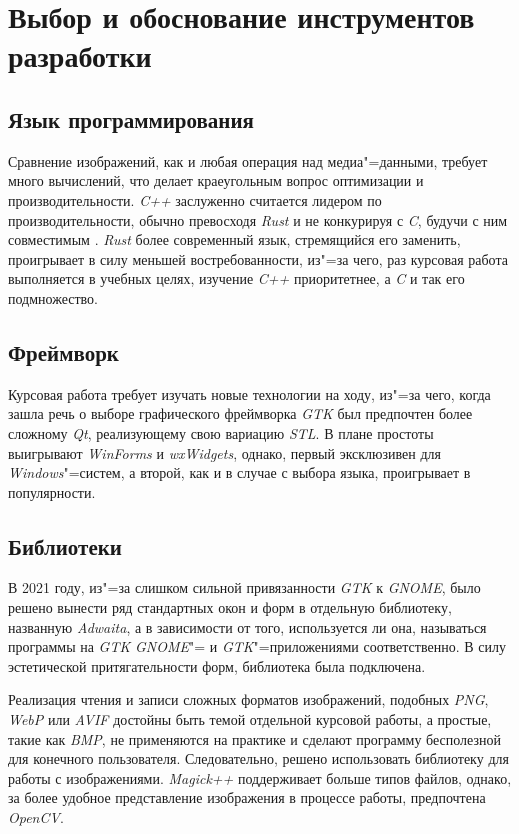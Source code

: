 \documentclass[variant=courcework]{bsuir}
\begin{document}
\section{Выбор и обоснование инструментов разработки}

\subsection{Язык программирования}
Сравнение изображений, как и любая операция над медиа"=данными, требует много
вычислений, что делает краеугольным вопрос оптимизации и производительности.
\textit{C++} заслуженно считается лидером по производительности, обычно
превосходя \textit{Rust} и не конкурируя с \textit{C}, будучи с ним совместимым
\cite{benchmarksgame}. \textit{Rust} более современный язык, стремящийся его
заменить, проигрывает в силу меньшей востребованности, из"=за чего, раз курсовая
работа выполняется в учебных целях, изучение \textit{C++} приоритетнее, а
\textit{C} и так его подмножество.

\subsection{Фреймворк}
Курсовая работа требует изучать новые технологии на ходу, из"=за чего, когда
зашла речь о выборе графического фреймворка \textit{GTK} был предпочтен более
сложному \textit{Qt}, реализующему свою вариацию \textit{STL}. В плане простоты
выигрывают \textit{WinForms} и \textit{wxWidgets}, однако, первый эксклюзивен
для \textit{Windows}"=систем, а второй, как и в случае с выбора языка,
проигрывает в популярности.

\subsection{Библиотеки}
В 2021 году, из"=за слишком сильной привязанности \textit{GTK} к \textit{GNOME},
было решено вынести ряд стандартных окон и форм в отдельную библиотеку,
названную \textit{Adwaita}, а в зависимости от того, используется ли она,
называться программы на \textit{GTK} \textit{GNOME}"= и
\textit{GTK}"=приложениями соответственно. В силу эстетической притягательности
форм, библиотека была подключена.

Реализация чтения и записи сложных форматов изображений, подобных \textit{PNG},
\textit{WebP} или \textit{AVIF} достойны быть темой отдельной курсовой работы, а
простые, такие как \textit{BMP}, не применяются на практике и сделают программу
бесполезной для конечного пользователя. Следовательно, решено использовать
библиотеку для работы с изображениями. \textit{Magick++} поддерживает больше
типов файлов, однако, за более удобное представление изображения в процессе
работы, предпочтена \textit{OpenCV}.
\end{document}

